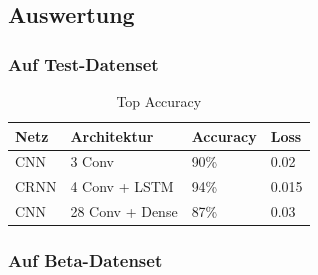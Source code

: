 \subsection{Auswertung}

\subsubsection{Auf Test-Datenset}

\begin{table}[h]
	\centering
	\begin{tabular}{llll}
		\hline
		Netz & Architektur     & Accuracy & Loss  \\ \hline
		CNN  & 3 Conv          & 90\%     & 0.02  \\
		CRNN & 4 Conv + LSTM   & 94\%     & 0.015 \\
		CNN  & 28 Conv + Dense & 87\%     & 0.03  \\ \hline
	\end{tabular}
	\caption{Top Accuracy}
	\label{table:test}
\end{table}

\subsubsection{Auf Beta-Datenset}